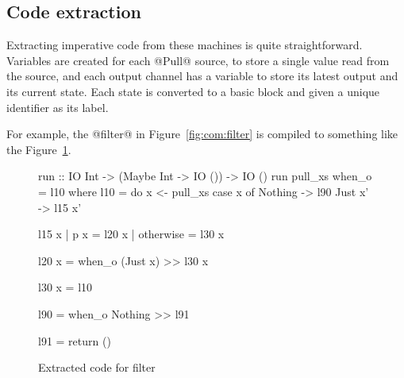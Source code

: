 \subsection{Code extraction}

Extracting imperative code from these machines is quite straightforward.
Variables are created for each @Pull@ source, to store a single value read from the source, and each output channel has a variable to store its latest output and its current state.
Each state is converted to a basic block and given a unique identifier as its label.

For example, the @filter@ in Figure~\ref{fig:com:filter} is compiled to something like the Figure~\ref{fig:extract:filter}.

\begin{figure}
\begin{code}
run :: IO Int -> (Maybe Int -> IO ()) -> IO ()
run pull_xs when_o = l10
 where
  l10 = do  x  <- pull_xs
            case x of
             Nothing -> l90
             Just x' -> l15 x'

  l15 x | p x       = l20 x
        | otherwise = l30 x

  l20 x =   when_o (Just x)  >> l30 x

  l30 x =   l10

  l90   =   when_o Nothing  >> l91

  l91   =   return ()
\end{code}
\caption{Extracted code for filter}
\label{fig:extract:filter}
\end{figure}

